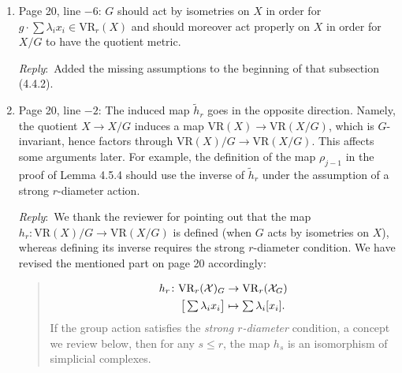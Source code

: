 \documentclass{amsart}
\newcommand{\ar}{\medskip\noindent\textit{Reply}:\ }
\begin{document}
\begin{enumerate}
		\begin{quote}
			..., corresponding to $u_n=1$ and $u_i=0$ for $i\neq n$.
		\end{quote}

		\smallskip

		At the end of .4, we add the following sentences:

		\begin{quote}
			In particular, each $m$-sphere summand contributes a bar $(0,\zeta_m)$
			to $\Hbarc[\field]{m}{\VS^{u_1,\dots,u_n}}$,
			and this occurs with multiplicity $u_m$.
			Since $\zeta_1 > \dots > \zeta_n$,
			the smallest threshold $\zeta_n$ determines the vertical dashed line
			in Figure~2.
		\end{quote}

		\item Page 20, line $-6$: $G$ should act by isometries on $X$ in order for $g \cdot \sum \lambda_i x_i \in \mathrm{VR}_r(X)$ and should moreover act properly on $X$ in order for $X/G$ to have the quotient metric.

		\ar Added the missing assumptions to the beginning of that subsection (4.4.2).

		\item Page 20, line $-2$: The induced map $\tilde{h}_r$ goes in the opposite direction. Namely, the quotient $X \to X/G$ induces a map $\mathrm{VR}(X) \to \mathrm{VR}(X/G)$, which is $G$-invariant, hence factors through $\mathrm{VR}(X)/G \to \mathrm{VR}(X/G)$. This affects some arguments later. For example, the definition of the map $\rho_{j-1}$ in the proof of Lemma 4.5.4 should use the inverse of $\tilde{h}_r$ under the assumption of a strong $r$-diameter action.

		\ar We thank the reviewer for pointing out that the map $h_r:\mathrm{VR}(X)/G \to \mathrm{VR}(X/G)$ is defined (when $G$ acts by isometries on $X$), whereas defining its inverse requires the strong $r$-diameter condition. We have revised the mentioned part on page 20 accordingly:
		\begin{quote}
			\begin{align*}
				h_r \colon \mathrm{VR}_r(\mathcal{X})_G &\to  \mathrm{VR}_r(\mathcal{X}_G) \\
				\textstyle \big[\sum\lambda_i x_i\big] & \mapsto \textstyle\sum\lambda_i [x_i].
			\end{align*}
			If the group action satisfies the \textit{strong \(r\)-diameter} condition, a concept we review below, then for any \(s \leq r\), the map $h_s$ is an isomorphism of simplicial complexes.
		\end{quote}


\end{enumerate}
\end{document}
